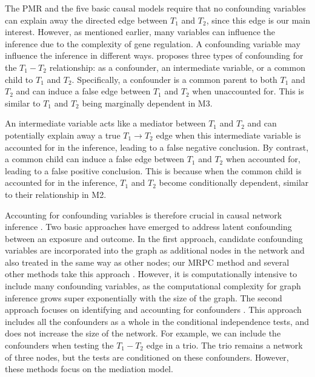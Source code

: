 \documentclass[12pt,letterpaper]{report}
\begin{document}
\begin{doublespace}
The PMR and the five basic causal models require that no confounding variables can explain away the directed edge between $T_1$ and $T_2$, since this edge is our main interest.  However, as mentioned earlier, many variables can influence the inference due to the complexity of gene regulation.  A confounding variable may influence the inference in different ways.  \cite{yang2017identifying} proposes three types of confounding for the $T_1-T_2$ relationship: as a confounder, an intermediate variable, or a common child to $T_1$ and $T_2$. Specifically, a confounder is a common parent to both $T_1$ and $T_2$ and can induce a false edge between $T_1$ and $T_2$ when unaccounted for.  This is similar to $T_1$ and $T_2$ being marginally dependent in M3.  

An intermediate variable acts like a mediator between $T_1$ and $T_2$ and can potentially explain away a true $T_1 \rightarrow T_2$ edge when this intermediate variable is accounted for in the inference, leading to a false negative conclusion.  By contrast, a common child can induce a false edge between $T_1$ and $T_2$ when accounted for, leading to a false positive conclusion.  This is because when the common child is accounted for in the inference, $T_1$ and $T_2$ become conditionally dependent, similar to their relationship in M2.  

Accounting for confounding variables is therefore crucial in causal network inference \cite{burgess2015network, yang2017identifying, shan2019identification, amar2021graphical, zhao2024adjusting}. Two basic approaches have emerged to address latent confounding between an exposure and outcome. In the first approach, candidate confounding variables are incorporated into the graph as additional nodes in the network and also treated in the same way as other nodes; our MRPC method and several other methods take this approach \cite{badsha2019learning, amar2021graphical}. However, it is computationally intensive to include many confounding variables, as the computational complexity for graph inference grows super exponentially with the size of the graph. The second approach focuses on identifying and accounting for confounders \cite{yang2017identifying, shan2019identification, burgess2015network}. This approach includes all the confounders as a whole in the conditional independence tests, and does not increase the size of the network.  For example, we can include the confounders when testing the $T_1 - T_2$ edge in a trio.  The trio remains a network of three nodes, but the tests are conditioned on these confounders.  However, these methods focus on the mediation model.


\end{doublespace}
\end{document}
